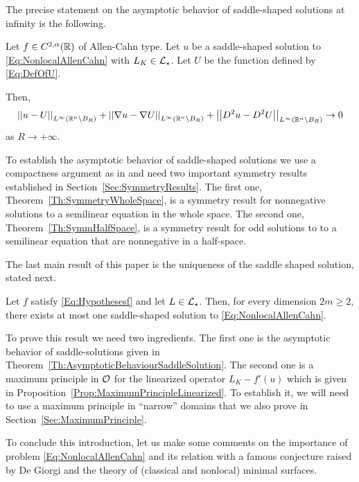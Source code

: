 The precise statement on the asymptotic behavior of saddle-shaped solutions at infinity is the following.

\begin{theorem}
	\label{Th:AsymptoticBehaviourSaddleSolution}
	Let $f\in C^{2,\alpha}(\mathbb{R})$ of Allen-Cahn type. Let $u$ be a saddle-shaped solution to \eqref{Eq:NonlocalAllenCahn} with $L_K \in \mathcal{L}_\star$. Let $U$ be the function defined by \eqref{Eq:DefOfU}.
	
	Then,
	$$
	\left | \left |{u-U} \right | \right |_{L^\infty(\mathbb{R}^n\setminus B_R)}
	+\left | \left |{\nabla u-\nabla U} \right | \right |_{L^\infty(\mathbb{R}^n\setminus B_R)}
	+\left | \left |{D^2u-D^2U} \right | \right |_{L^\infty(\mathbb{R}^n\setminus B_R)} \to 0
	$$
	as $ R\to +\infty$.
\end{theorem}

To establish the asymptotic behavior of saddle-shaped solutions we use a compactness argument as in \cite{CabreTerraII, Cinti-Saddle, Cinti-Saddle2} and need two important symmetry results established in Section~\ref{Sec:SymmetryResults}. The first one, Theorem~\ref{Th:SymmetryWholeSpace}, is a symmetry result for nonnegative solutions to a semilinear equation in the whole space. The second one, Theorem~\ref{Th:SymmHalfSpace}, is a symmetry result for odd solutions to to a semilinear equation that are nonnegative in a half-space.

The last main result of this paper is the uniqueness of the saddle shaped solution, stated next.

\begin{theorem}
	\label{Th:Uniqueness}
    Let $f$ satisfy \eqref{Eq:Hypothesesf} and let $L\in \mathcal{L}_\star$. Then, for every dimension $2m \geq 2$, there exists at most one saddle-shaped solution to \eqref{Eq:NonlocalAllenCahn}.
\end{theorem}

To prove this result we need two ingredients. The first one is the asymptotic behavior of saddle-solutions given in Theorem~\ref{Th:AsymptoticBehaviourSaddleSolution}. The second one is a maximum principle in $\mathcal{O}$ for the linearized operator $L_K - f'(u)$ which is given in Proposition~\ref{Prop:MaximumPrincipleLinearized}. To establish it, we will need to use a maximum principle in ``narrow'' domains that we also prove in Section~\ref{Sec:MaximumPrinciple}.

To conclude this introduction, let us make some comments on the importance of problem \eqref{Eq:NonlocalAllenCahn} and its relation with a famous conjecture raised by De Giorgi and the theory of (classical and nonlocal) minimal surfaces.

